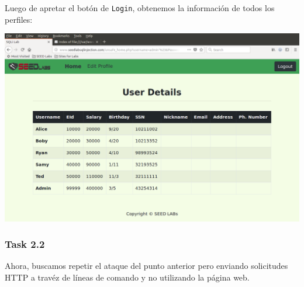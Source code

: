 \documentclass[11pt]{article}
\begin{document}
Luego de apretar el botón de \verb|Login|, obtenemos la información de todos los perfiles:
\begin{center}
    \includegraphics[scale=.34]{task2_1_2_sql.png}
\end{center}

\subsubsection*{Task 2.2}
Ahora, buscamos repetir el ataque del punto anterior pero enviando solicitudes HTTP a travéz de líneas de comando
y no utilizando la página web.
\end{document}

